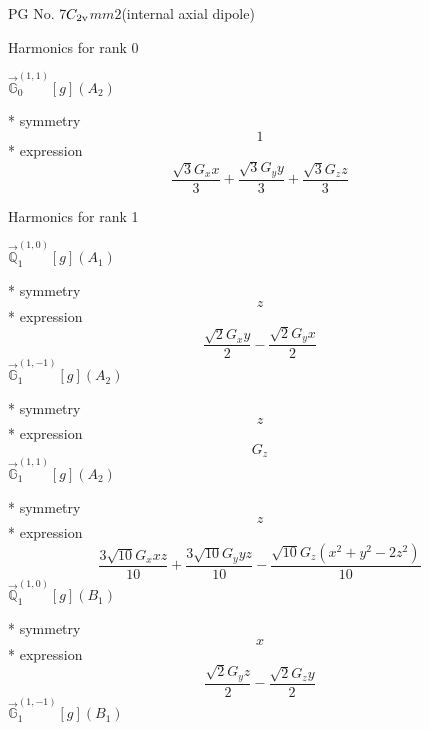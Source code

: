 \documentclass[fleqn,8pt]{jsarticle}
\begin{document}
\setcounter{MaxMatrixCols}{32}

\renewcommand{\tablename}{Table~}
\renewcommand{\figurename}{Figure~}
\begin{center}
\LARGE
PG No. 7\quad$C_{\rm 2v}$\quad$mm2$\quad[ orthorhombic ] (internal axial dipole)
\end{center}

\noindent * Harmonics for rank 0

\noindent\quad $\vec{\mathbb{G}}_{0}^{(1,1)}[g](A_{2})$

\noindent\quad ** symmetry
\begin{dmath*}
1
\end{dmath*}
\noindent\quad ** expression
\begin{dmath*}
\frac{\sqrt{3} G_{x} x}{3} + \frac{\sqrt{3} G_{y} y}{3} + \frac{\sqrt{3} G_{z} z}{3}
\end{dmath*}

\noindent * Harmonics for rank 1

\noindent\quad $\vec{\mathbb{Q}}_{1}^{(1,0)}[g](A_{1})$

\noindent\quad ** symmetry
\begin{dmath*}
z
\end{dmath*}
\noindent\quad ** expression
\begin{dmath*}
\frac{\sqrt{2} G_{x} y}{2} - \frac{\sqrt{2} G_{y} x}{2}
\end{dmath*}
\noindent\quad $\vec{\mathbb{G}}_{1}^{(1,-1)}[g](A_{2})$

\noindent\quad ** symmetry
\begin{dmath*}
z
\end{dmath*}
\noindent\quad ** expression
\begin{dmath*}
G_{z}
\end{dmath*}
\noindent\quad $\vec{\mathbb{G}}_{1}^{(1,1)}[g](A_{2})$

\noindent\quad ** symmetry
\begin{dmath*}
z
\end{dmath*}
\noindent\quad ** expression
\begin{dmath*}
\frac{3 \sqrt{10} G_{x} x z}{10} + \frac{3 \sqrt{10} G_{y} y z}{10} - \frac{\sqrt{10} G_{z} \left(x^{2} + y^{2} - 2 z^{2}\right)}{10}
\end{dmath*}
\noindent\quad $\vec{\mathbb{Q}}_{1}^{(1,0)}[g](B_{1})$

\noindent\quad ** symmetry
\begin{dmath*}
x
\end{dmath*}
\noindent\quad ** expression
\begin{dmath*}
\frac{\sqrt{2} G_{y} z}{2} - \frac{\sqrt{2} G_{z} y}{2}
\end{dmath*}
\noindent\quad $\vec{\mathbb{G}}_{1}^{(1,-1)}[g](B_{1})$
\end{document}

